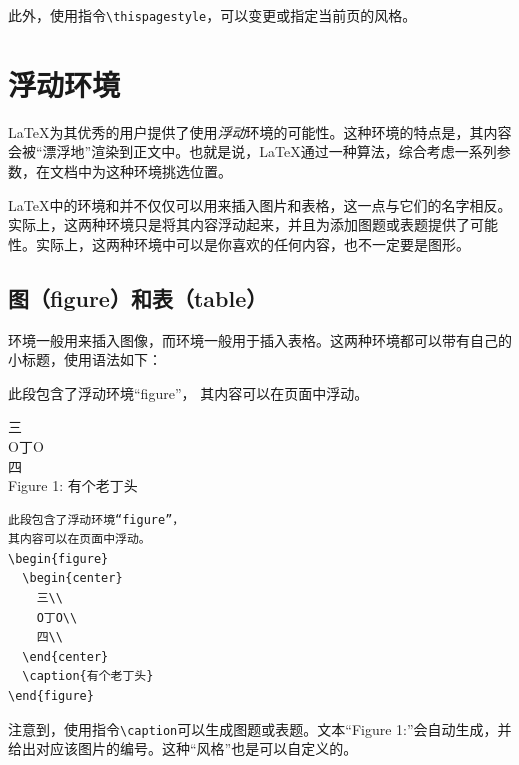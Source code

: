 此外，使用指令\verb|\thispagestyle|，可以变更或指定当前页的风格。

\section{浮动环境}

\LaTeX 为其优秀的用户提供了使用\emph{浮动}环境的可能性。这种环境的特点是，其内容会被“漂浮地”渲染到正文中。也就是说，\LaTeX 通过一种算法，综合考虑一系列参数，在文档中为这种环境挑选位置。

\begin{exclamation}
\LaTeX 中的环境和并不仅仅可以用来插入图片和表格，这一点与它们的名字相反。实际上，这两种环境只是将其内容浮动起来，并且为添加图题或表题提供了可能性。实际上，这两种环境中可以是你喜欢的任何内容，也不一定要是图形。
\end{exclamation}

\subsection{图（figure）和表（table）}

环境一般用来插入图像，而环境一般用于插入表格。这两种环境都可以带有自己的小标题，使用语法如下：

\begin{codelist}[2.20]{
  此段包含了浮动环境“figure”，
其内容可以在页面中浮动。
  \begin{center}
三\\
O丁O\\
四\\
Figure 1: 有个老丁头
  \end{center}

}\begin{verbatim}
此段包含了浮动环境“figure”，
其内容可以在页面中浮动。
\begin{figure}
  \begin{center}
    三\\
    O丁O\\
    四\\
  \end{center}
  \caption{有个老丁头}
\end{figure}
\end{verbatim}
\end{codelist}

注意到，使用指令\verb|\caption|可以生成图题或表题。文本“Figure 1:”会自动生成，并给出对应该图片的编号。这种“风格”也是可以自定义的。

